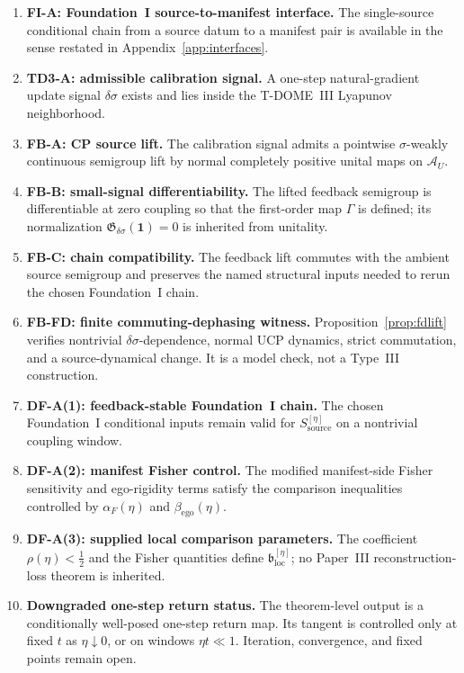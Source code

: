 \documentclass[12pt]{article}
\theoremstyle{definition}
\theoremstyle{remark}
\begin{document}
\begin{enumerate}
\item \textbf{FI-A: Foundation~I source-to-manifest interface.}
  The single-source conditional chain from a source datum to a manifest
  pair is available in the sense restated in
  Appendix~\ref{app:interfaces}.
\item \textbf{TD3-A: admissible calibration signal.}
  A one-step natural-gradient update signal \(\delta\sigma\) exists and
  lies inside the T-DOME~III Lyapunov neighborhood.
\item \textbf{FB-A: CP source lift.}
  The calibration signal admits a pointwise \(\sigma\)-weakly continuous
  semigroup lift by normal completely positive unital maps on
  \(\mathcal A_U\).
\item \textbf{FB-B: small-signal differentiability.}
  The lifted feedback semigroup is differentiable at zero coupling so
  that the first-order map \(\Gamma\) is defined; its normalization
  \(\mathfrak G_{\delta\sigma}(\mathbf 1)=0\) is inherited from
  unitality.
\item \textbf{FB-C: chain compatibility.}
  The feedback lift commutes with the ambient source semigroup and
  preserves the named structural inputs needed to rerun the chosen
  Foundation~I chain.
\item \textbf{FB-FD: finite commuting-dephasing witness.}
  Proposition~\ref{prop:fdlift} verifies nontrivial
  \(\delta\sigma\)-dependence, normal UCP dynamics, strict commutation,
  and a source-dynamical change. It is a model check, not a Type~III
  construction.
\item \textbf{DF-A(1): feedback-stable Foundation~I chain.}
  The chosen Foundation~I conditional inputs remain valid for
  \(S_{\mathrm{source}}^{[\eta]}\) on a nontrivial coupling window.
\item \textbf{DF-A(2): manifest Fisher control.}
  The modified manifest-side Fisher sensitivity and ego-rigidity terms
  satisfy the comparison inequalities controlled by
  \(\alpha_F(\eta)\) and \(\beta_{\mathrm{ego}}(\eta)\).
\item \textbf{DF-A(3): supplied local comparison parameters.}
  The coefficient \(\rho(\eta)<\tfrac12\) and the Fisher quantities
  define \(\mathfrak b_{\mathrm{loc}}^{[\eta]}\); no Paper~III
  reconstruction-loss theorem is inherited.
\item \textbf{Downgraded one-step return status.}
  The theorem-level output is a conditionally well-posed one-step return
  map. Its tangent is controlled only at fixed \(t\) as
  \(\eta\downarrow0\), or on windows \(\eta t\ll1\). Iteration,
  convergence, and fixed points remain open.
\end{enumerate}
\end{document}
